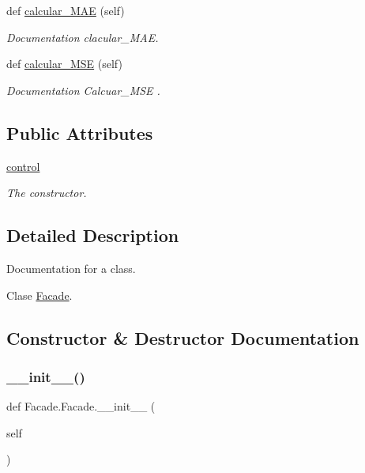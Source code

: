 \begin{DoxyCompactItemize}
def \mbox{\hyperlink{class_facade_1_1_facade_abb62f6ed9e166bc1041ad7a3c57c4d58}{calcular\+\_\+\+M\+AE}} (self)
\begin{DoxyCompactList}\small\item\em Documentation clacular\+\_\+\+M\+AE. \end{DoxyCompactList}\item 
def \mbox{\hyperlink{class_facade_1_1_facade_a37747590f3e1ade1250e56dd9c424d03}{calcular\+\_\+\+M\+SE}} (self)
\begin{DoxyCompactList}\small\item\em Documentation Calcuar\+\_\+\+M\+SE . \end{DoxyCompactList}\end{DoxyCompactItemize}
\subsection*{Public Attributes}
\begin{DoxyCompactItemize}
\item 
\mbox{\hyperlink{class_facade_1_1_facade_a4ec08f6f7094ff267875a3abc6f0cb1b}{control}}
\begin{DoxyCompactList}\small\item\em The constructor. \end{DoxyCompactList}\end{DoxyCompactItemize}


\subsection{Detailed Description}
Documentation for a class. 

Clase \mbox{\hyperlink{class_facade_1_1_facade}{Facade}}. 

\subsection{Constructor \& Destructor Documentation}
\mbox{\label{class_facade_1_1_facade_ad3ab1700c8824f9711bb33c34187f2b4}} 
\subsubsection{\texorpdfstring{\+\_\+\+\_\+init\+\_\+\+\_\+()}{\_\_init\_\_()}}
{\footnotesize\ttfamily def Facade.\+Facade.\+\_\+\+\_\+init\+\_\+\+\_\+ (\begin{DoxyParamCaption}\item[{}]{self }\end{DoxyParamCaption})}



